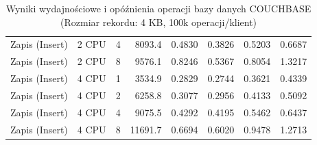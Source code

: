 \begin{table}[ht]
{\begin{tabular}{llcrrrrr}
Zapis (Insert) & 2 CPU & 4 & 8093.4 & 0.4830 & 0.3826 & 0.5203 & 0.6687 \\
Zapis (Insert) & 2 CPU & 8 & 9576.1 & 0.8246 & 0.5367 & 0.8054 & 1.3217 \\
Zapis (Insert) & 4 CPU & 1 & 3534.9 & 0.2829 & 0.2744 & 0.3621 & 0.4339 \\
Zapis (Insert) & 4 CPU & 2 & 6258.8 & 0.3077 & 0.2956 & 0.4133 & 0.5092 \\
Zapis (Insert) & 4 CPU & 4 & 9075.5 & 0.4292 & 0.4195 & 0.5462 & 0.6437 \\
Zapis (Insert) & 4 CPU & 8 & 11691.7 & 0.6694 & 0.6020 & 0.9478 & 1.2713 \\
\bottomrule
\end{tabular}%
}
\caption{Wyniki wydajnościowe i opóźnienia operacji bazy danych COUCHBASE (Rozmiar rekordu: 4 KB, 100k operacji/klient)}
\label{tab:latency_couchbase_medium_100000}
\end{table}
